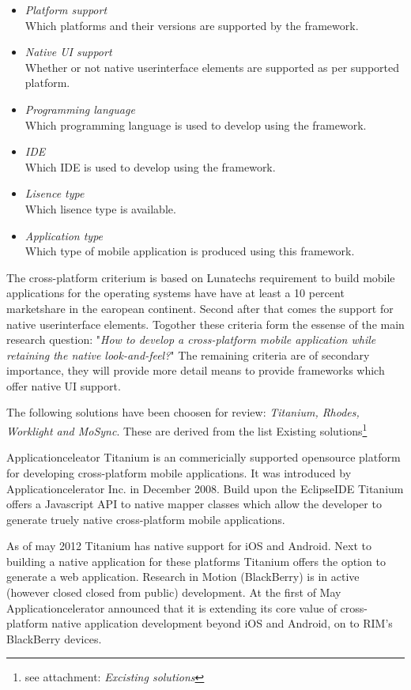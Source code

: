 \begin{itemize}
\item \emph{Platform support}\\
Which platforms and their versions are supported by the framework.
\item \emph{Native UI support}\\
Whether or not native userinterface elements are supported as per supported platform.
\item \emph{Programming language}\\
Which programming language is used to develop using the framework.
\item \emph{IDE}\\
Which IDE is used to develop using the framework.
\item \emph{Lisence type}\\
Which lisence type is available.
\item \emph{Application type}\\
Which type of mobile application is produced using this framework.
\end{itemize}

The cross-platform criterium is based on Lunatechs requirement to build mobile applications for the operating systems have have at least a 10 percent marketshare in the earopean continent. Second after that comes the support for native userinterface elements. Togother these criteria form the essense of the main research question: "\emph{How to develop a cross-platform mobile application while retaining the native look-and-feel?}"
The remaining criteria are of secondary importance, they will provide more detail means to provide frameworks which offer native UI support.

The following solutions have been choosen for review: \emph{Titanium, Rhodes, Worklight and MoSync}. These are derived from the list Existing solutions\footnote{see attachment: \emph{Excisting solutions}} %


Applicationceleator Titanium is an commericially supported opensource platform for developing cross-platform mobile applications. It was introduced by Applicationcelerator Inc. in December 2008. Build upon the EclipseIDE Titanium offers a Javascript API to native mapper classes which allow the developer to generate truely native cross-platform mobile applications.

As of may 2012 Titanium has native support for iOS and Android. Next to building a native application for these platforms Titanium offers the option to generate a web application. 
Research in Motion (BlackBerry) is in active (however closed closed from public) development. At the first of May Applicationcelerator announced that it is extending its core value of cross-platform native application development beyond iOS and Android, on to RIM's BlackBerry devices.\cite{Asher2012}

